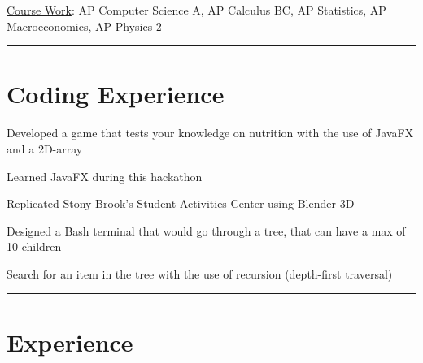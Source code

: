 \documentclass[]{deedy-resume-openfont}
\begin{document}

\hspace{0.2 in }\underline{Course Work}:  AP Computer Science A, AP Calculus BC, AP Statistics, AP Macroeconomics, AP Physics 2

\noindent\rule{\textwidth}{0.4pt}
\section{Coding Experience}

\begin{tightemize}
\item Developed a game that tests your knowledge on nutrition with the use of JavaFX and a 2D-array
\item  Learned JavaFX during this hackathon
\end{tightemize}
\sectionsep

\begin{tightemize}
\item Replicated Stony Brook’s Student Activities Center using Blender 3D
\end{tightemize}
\sectionsep

\begin{tightemize}
\item Designed a Bash terminal that would go through a tree, that can have a max of 10 children
\item Search for an item in the tree with the use of recursion (depth-first traversal)
\end{tightemize}
\noindent\rule{\textwidth}{0.4pt}
\section{Experience}
\end{document}
